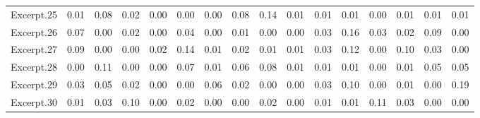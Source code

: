\documentclass[
]{article}
\newenvironment{lltable}{\begin{landscape}\begin{center}\begin{ThreePartTable}}{\end{ThreePartTable}\end{center}\end{landscape}}
\begin{document}
\begin{lltable}
{\begin{longtable}{llllllllllllllll}
Excerpt.25 & 0.01 & 0.08 & 0.02 & 0.00 & 0.00 & 0.00 & 0.08 & 0.14 & 0.01 & 0.01 & 0.01 & 0.00 & 0.01 & 0.01 & 0.01\\
Excerpt.26 & 0.07 & 0.00 & 0.02 & 0.00 & 0.04 & 0.00 & 0.01 & 0.00 & 0.00 & 0.03 & 0.16 & 0.03 & 0.02 & 0.09 & 0.00\\
Excerpt.27 & 0.09 & 0.00 & 0.00 & 0.02 & 0.14 & 0.01 & 0.02 & 0.01 & 0.01 & 0.03 & 0.12 & 0.00 & 0.10 & 0.03 & 0.00\\
Excerpt.28 & 0.00 & 0.11 & 0.00 & 0.00 & 0.07 & 0.01 & 0.06 & 0.08 & 0.01 & 0.01 & 0.01 & 0.00 & 0.01 & 0.05 & 0.05\\
Excerpt.29 & 0.03 & 0.05 & 0.02 & 0.00 & 0.00 & 0.06 & 0.02 & 0.00 & 0.00 & 0.03 & 0.10 & 0.00 & 0.01 & 0.00 & 0.19\\
Excerpt.30 & 0.01 & 0.03 & 0.10 & 0.00 & 0.02 & 0.00 & 0.00 & 0.02 & 0.00 & 0.01 & 0.01 & 0.11 & 0.03 & 0.00 & 0.00\\
\bottomrule
\end{longtable}

}

\end{lltable}
\end{document}

